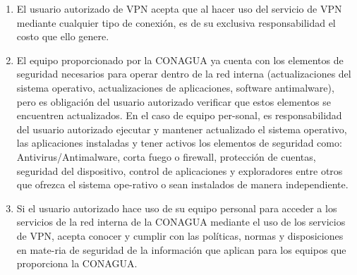 \documentclass[letterpaper,11pt]{article}
\begin{document}
{\begin{enumerate}
	\item El usuario autorizado de VPN acepta que al hacer uso del servicio de VPN mediante cualquier tipo de conexión, es de su exclusiva responsabilidad el costo que ello genere.
           \item El equipo proporcionado por la CONAGUA ya cuenta con los elementos de seguridad necesarios para operar dentro de la red interna (actualizaciones del sistema operativo, actualizaciones de aplicaciones, software antimalware), pero es obligación del usuario autorizado verificar que estos elementos se encuentren actualizados. En el caso de equipo per-sonal, es responsabilidad del usuario autorizado ejecutar y mantener actualizado el sistema operativo, las aplicaciones instaladas y tener activos los elementos de seguridad como: Antivirus/Antimalware, corta fuego o firewall, protección de cuentas, seguridad del dispositivo, control de aplicaciones y exploradores entre otros que ofrezca el sistema ope-rativo o sean instalados de manera independiente.
            \item Si el usuario autorizado hace uso de su equipo personal para acceder a los servicios de la red interna de la CONAGUA mediante el uso de los servicios de VPN, acepta conocer y cumplir con las políticas, normas y disposiciones en mate-ria de seguridad de la información que aplican para los equipos que proporciona la CONAGUA.

\end{enumerate}}
\end{document}
